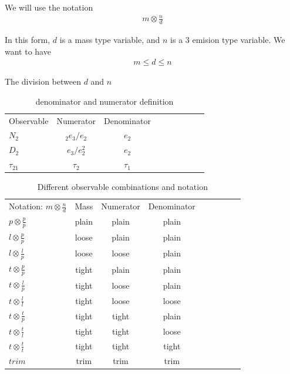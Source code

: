 \documentclass[11pt,letterpaper]{article}
\newcommand{\ecfnobeta}[1]{e_{#1}}
\newcommand{\ecfvarnobeta}[2]{{_{#1}e_{#2}}}
\begin{document}
We will use the notation
\begin{align}
m \otimes \frac{n}{d}
\end{align}

In this form, $d$ is a mass type variable, and $n$ is a $3$ emision type variable. We want to have
\begin{align}
m \leq d \leq n
\end{align}

The division between $d$ and $n$

\begin{table}
\begin{center}
\begin{tabular}{| l | c | c |c |c|c|c |c|r| }
  \hline                       
  Observable &  Numerator & Denominator \\
  $N_2$ &   $\ecfvarnobeta{2}{3} / \ecfnobeta{2} $ & $ \ecfnobeta{2}$ \\
  $D_2$ &   $\ecfnobeta{3} / \ecfnobeta{2}^2 $ & $ \ecfnobeta{2}$ \\
  $\tau_{21}$ &   $\tau_2$ & $\tau_1$ \\
  \hline  
\end{tabular}
\end{center}
\caption{
denominator and numerator definition
}
\label{tab:PC}
\end{table}



\begin{table}
\begin{center}
\begin{tabular}{| l | c | c |c |c|c|c |c|r| }
  \hline                       
  Notation: $m \otimes \frac{n}{d}$ & Mass & Numerator & Denominator \\
  $p \otimes \frac{p}{p}$ & plain  &  plain & plain \\
  $l \otimes \frac{p}{p}$ & loose  &  plain & plain \\
  $l \otimes \frac{l}{p}$ & loose  &  loose & plain \\
  $t \otimes \frac{p}{p}$ & tight  &  plain & plain \\
  $t \otimes \frac{l}{p}$ & tight  &  loose & plain \\
  $t \otimes \frac{l}{l}$ & tight  &  loose & loose \\
  $t \otimes \frac{t}{p}$ & tight  &  tight & plain \\
  $t \otimes \frac{t}{l}$ & tight  &  tight & loose \\
  $t \otimes \frac{t}{t}$ & tight  &  tight & tight \\
  $trim$ & trim &  trim & trim \\
  \hline  
\end{tabular}
\end{center}
\caption{
Different observable combinations and notation
}
\label{tab:PC}
\end{table}
\end{document}

